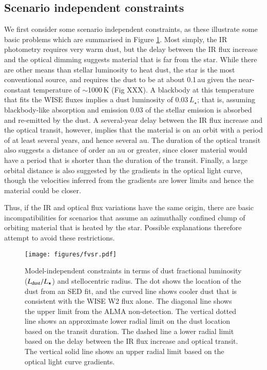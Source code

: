 \documentclass{aa}
\begin{document}
\subsection{Scenario independent constraints}

We first consider some scenario independent constraints, as these illustrate some basic problems which are summarised in Figure \ref{fig:constr}.
%
Most simply, the IR photometry requires very warm dust, but the delay between the IR flux increase and the optical dimming suggests material that is far from the star.
%
While there are other means than stellar luminosity to heat dust, the star is the most conventional source, and requires the dust to be at about 0.1\,au given the near-constant temperature of $\sim$1000\,K (Fig XXX). A blackbody at this temperature that fits the WISE fluxes implies a dust luminosity of 0.03\,$L_\star$; that is, assuming blackbody-like absorption and emission 0.03 of the stellar emission is absorbed and re-emitted by the dust.
%
A several-year delay between the IR flux increase and the optical transit, however, implies that the material is on an orbit with a period of at least several years, and hence several au.
%
The duration of the optical transit also suggests a distance of order an au or greater, since closer material would have a period that is shorter than the duration of the transit.
%
Finally, a large orbital distance is also suggested by the gradients in the optical light curve, though the velocities inferred from the gradients are lower limits and hence the material could be closer.

Thus, if the IR and optical flux variations have the same origin, there are basic incompatibilities for scenarios that assume an azimuthally confined clump of orbiting material that is heated by the star.
%
Possible explanations therefore attempt to avoid these restrictions.

\begin{figure}
    \centering
    \texttt{[image: figures/fvsr.pdf]}
    \caption{Model-independent constraints in terms of dust fractional luminosity ($L_{\rm dust}/L_\star$) and stellocentric radius.
    The dot shows the location of the dust from an SED fit, and the curved line shows cooler dust that is consistent with the WISE W2 flux alone.
    The diagonal line shows the upper limit from the ALMA non-detection.
    The vertical dotted line shows an approximate lower radial limit on the dust location based on the transit duration.
    The dashed line a lower radial limit based on the delay between the IR flux increase and optical transit.
    The vertical solid line shows an upper radial limit based on the optical light curve gradients.}
    \label{fig:constr}
\end{figure}
\end{document}
